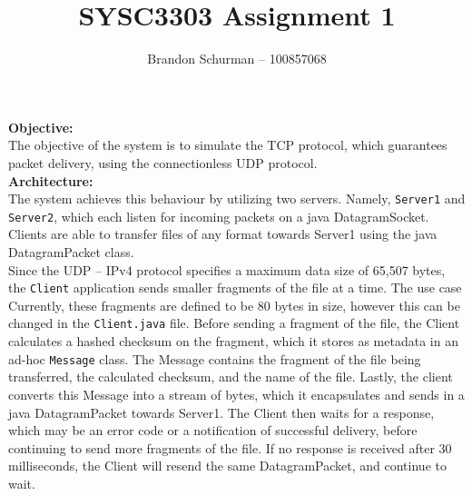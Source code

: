 \documentclass[12pt]{article}
\begin{document}

\title{\bf SYSC3303 Assignment 1}
\author{Brandon Schurman -- 100857068}
\maketitle


\noindent
{\bf Objective:}
\vspace{2mm} \\ 
The objective of the system is to simulate the TCP protocol, which guarantees packet
delivery, using the connectionless UDP protocol.  
\vspace{5mm} \\

\noindent
{\bf Architecture:}
\vspace{2mm} \\
\indent The system achieves this behaviour by utilizing two servers. Namely, {\tt Server1} and
{\tt Server2}, which each listen for incoming packets on a java DatagramSocket.
Clients are able to transfer files of any format towards Server1 using the java
DatagramPacket class. \\ 

Since the UDP -- IPv4 protocol specifies a maximum data size of
65,507 bytes, the {\tt Client} application sends smaller fragments of the file at a time.
The use case
Currently, these fragments are defined to be 80 bytes in size, however this can be changed
in the {\tt Client.java} file. Before sending a fragment of the file, the Client
calculates a hashed checksum on the fragment, which it stores as metadata in an ad-hoc 
{\tt Message} class. The Message contains the fragment of the file being transferred,
the calculated checksum, and the name of the file. Lastly, the client converts this
Message into a stream of bytes, which it encapsulates and sends in a java DatagramPacket
towards Server1. The Client then waits for a response, which may be an error code or a
notification of successful delivery, before continuing to send more fragments of the file. 
If no response is received after 30 milliseconds, the Client will resend the same
DatagramPacket, and continue to wait. \\
\end{document}
